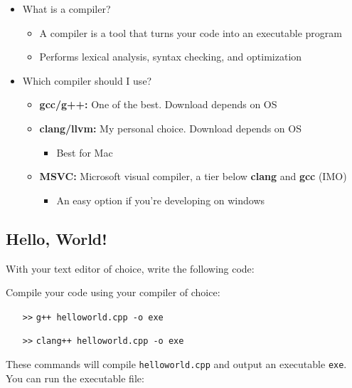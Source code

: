\documentclass{article}
\begin{document}
\begin{itemize}
	\item What is a compiler? \begin{itemize}
		\item A compiler is a tool that turns your code into an executable program
		\item Performs lexical analysis, syntax checking, and optimization
	\end{itemize}
	\item Which compiler should I use?
	\begin{itemize}
		\item \textbf{gcc/g++:} One of the best. Download depends on OS
		\item \textbf{clang/llvm:} My personal choice. Download depends on OS
		\begin{itemize}
			\item Best for Mac
		\end{itemize}
		\item \textbf{MSVC:} Microsoft visual compiler, a tier below \textbf{clang} and \textbf{gcc} (IMO)
		\begin{itemize}
			\item An easy option if you're developing on windows
		\end{itemize}
	\end{itemize}
\end{itemize}

\subsection{Hello, World!}

\noindent
With your text editor of choice, write the following code:

\vspace{.5em}

\vspace{.5em}

\noindent
Compile your code using your compiler of choice:

\begin{itemize}
	\item[\texttt{>>}] \texttt{g++ helloworld.cpp -o exe}
	\item[\texttt{>>}] \texttt{clang++ helloworld.cpp -o exe}
\end{itemize}

\noindent
These commands will compile \texttt{helloworld.cpp} and output an executable \texttt{exe}. You can run the executable file:
\end{document}
